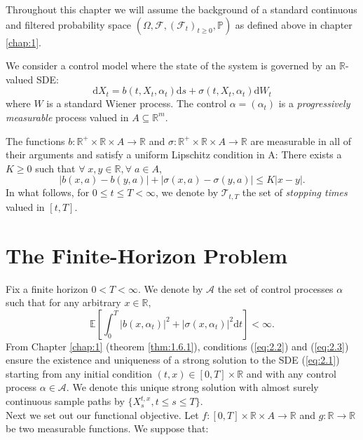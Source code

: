 Throughout this chapter we will assume the background of a standard continuous and filtered probability space
$(\Omega,\mathcal{F},(\mathcal{F}_t)_{t\geq0},\mathbb{P})$ as defined above in chapter \ref{chap:1}.

\begin{definition}
    We consider a control model where the state of the system is governed by 
    an $\mathbb{R}$-valued SDE:
    \begin{equation}\label{eq:2.1}
        \mathrm dX_t=b(t,X_t,\alpha_t)\mathrm ds+\sigma(t,X_t,\alpha_t)\mathrm dW_t
    \end{equation}
    where $W$ is a standard Wiener process. The control $\alpha=(\alpha_t)$ is a 
    \emph{progressively measurable} process valued in $A\subseteq\mathbb{R}^m$.
\end{definition}

The functions $b:\mathbb{R}^+\times\mathbb{R}\times A\rightarrow\mathbb{R}$
and $\sigma:\mathbb{R}^+\times\mathbb{R}\times A\rightarrow\mathbb{R}$ are measurable
in all of their arguments and satisfy a uniform Lipschitz condition in A:
There exists a $K\geq0$ such that $\forall\;x,y\in\mathbb{R}, \forall\;a\in A,$
\begin{equation}\label{eq:2.2}
    |b(x,a)-b(y,a)|+|\sigma(x,a)-\sigma(y,a)|\leq K|x-y|.
\end{equation}
In what follows, for $0\leq t\leq T<\infty$, we denote by $\mathcal{T}_{t,T}$ the
set of \emph{stopping times} valued in $[t,T]$.

\section{The Finite-Horizon Problem}\label{sec:2.3}

Fix a finite horizon $0<T<\infty$. We denote by $\mathcal{A}$ the set of control
processes $\alpha$ such that for any arbitrary $x\in\mathbb{R},$
\begin{equation}\label{eq:2.3}
    \mathbb{E}\left[\int_0^T|b(x,\alpha_t)|^2+|\sigma(x,\alpha_t)|^2\mathrm dt\right]<\infty.
\end{equation}
From Chapter \ref{chap:1} (theorem \ref{thm:1.6.1}), conditions (\ref{eq:2.2}) and (\ref{eq:2.3}) ensure the existence
and uniqueness of a strong solution to the SDE (\ref{eq:2.1}) starting from any initial
condition $(t,x)\in[0,T]\times\mathbb{R}$ and with any control process $\alpha\in\mathcal{A}$.
We denote this unique strong solution with almost surely continuous sample paths by 
$\{X_s^{t,x},t\leq s\leq T\}$.\\
Next we set out our functional objective. Let $f:[0,T]\times\mathbb{R}\times A\rightarrow\mathbb{R}$
and $g:\mathbb{R}\rightarrow\mathbb{R}$ be two measurable functions. We suppose that:


